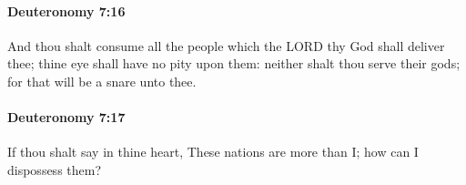 		\paragraph{Deuteronomy 7:16} %
			\label{DEUTERONOMY-7-16}

			And thou shalt consume all the people which the LORD thy God shall deliver thee; thine eye shall have no pity upon them: neither shalt thou serve their gods; for that will be a snare unto thee.


		\paragraph{Deuteronomy 7:17} %
			\label{DEUTERONOMY-7-17}

			If thou shalt say in thine heart, These nations are more than I; how can I dispossess them?


